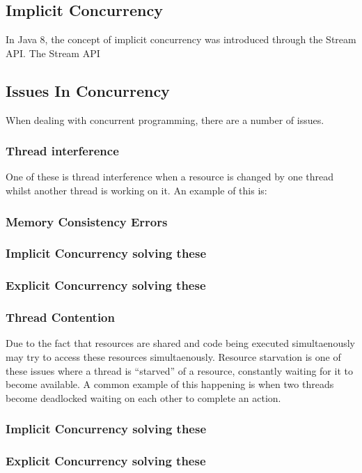 \documentclass[]{report}
\begin{document}
\subsection{Implicit Concurrency}

In Java 8, the concept of implicit concurrency was introduced through the Stream API. The Stream API

\subsection{Issues In Concurrency}
When dealing with concurrent programming, there are a number of issues. 

\subsubsection{Thread interference}
One of these is thread interference when a resource is changed by one thread whilst another thread is working on it. An example of this is:
\subsubsection{Memory Consistency Errors}
\subsubsection{Implicit Concurrency solving these}
\subsubsection{Explicit Concurrency solving these}
\subsubsection{Thread Contention}
Due to the fact that resources are shared and code being executed simultaenously may try to access these resources simultaenously. Resource starvation is one of these issues where a thread is “starved” of a resource, constantly waiting for it to become available. A common example of this happening is when two threads become deadlocked waiting on each other to complete an action.
\subsubsection{Implicit Concurrency solving these}
\subsubsection{Explicit Concurrency solving these}
\end{document}
